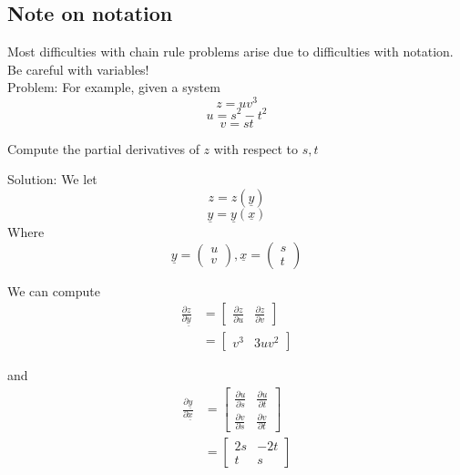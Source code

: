    \subsection{Note on notation}

   Most difficulties with chain rule problems arise due to difficulties with notation. Be careful with variables! \\

   Problem: For example, given a system \[
     z = uv^3
   \] 
   \[
     u = s^2 - t^2
   \] 
   \[
     v = st
   \] 

   Compute the partial derivatives of $z$ with respect to $s, t$

   Solution: We let 
   \[
     z = z ( \underline{y})
   \] 
   \[
      \underline{y} = \underline{y} ( \underline{x})
   \] 
   Where 
   \[
     \underline{y} = \begin{pmatrix} u \\ v \end{pmatrix}, \underline{x} = \begin{pmatrix} s \\ t \end{pmatrix} 
   \] 

   We can compute 
   \begin{align*}
      \frac{\partial z }{\partial \underline{y} } &= \begin{bmatrix} 
         \frac{\partial z}{\partial u} & \frac{\partial z}{ \partial v}  
      \end{bmatrix} \\ 
                                                  &=  \begin{bmatrix} 
                                                     v^3 & 3uv^2  
                                                  \end{bmatrix}
   \end{align*}

   and 
   \begin{align*}
      \frac{\partial \underline{y}}{ \partial \underline{x}} &= \begin{bmatrix} 
        \frac{\partial u}{\partial s} & \frac{\partial u}{\partial t} \\
        \frac{\partial v}{\partial s} & \frac{\partial v}{\partial t}
     \end{bmatrix}  \\
                                                             &= \begin{bmatrix} 
                                                                2s & -2t \\
                                                                t & s
                                                             \end{bmatrix}
   \end{align*}

